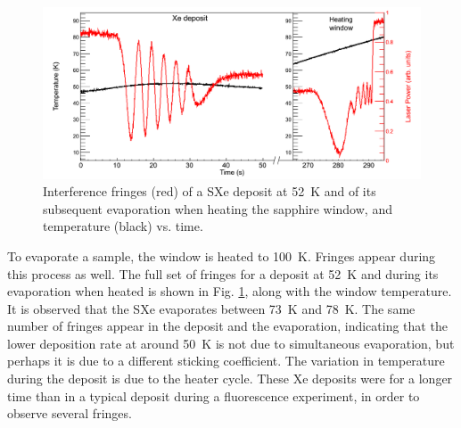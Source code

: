 \begin{figure} %
        \centering
                \includegraphics[width=.9\textwidth]{figures/fringes_dep_and_melt.png}
                \caption{Interference fringes (red) of a SXe deposit at 52~K and of its subsequent evaporation when heating the sapphire window, and temperature (black) vs. time.}
\label{fig:fringes_melt_withDep}
\end{figure}

To evaporate a sample, the window is heated to 100~K.  Fringes appear during this process as well.  The full set of fringes for a deposit at 52~K and during its evaporation when heated is shown in Fig. \ref{fig:fringes_melt_withDep}, along with the window temperature.  It is observed that the SXe evaporates between 73~K and 78~K.  The same number of fringes appear in the deposit and the evaporation, indicating that the lower deposition rate at around 50~K is not due to simultaneous evaporation, but perhaps it is due to a different sticking coefficient.  The variation in temperature during the deposit is due to the heater cycle.  These Xe deposits were for a longer time than in a typical deposit during a fluorescence experiment, in order to observe several fringes.



